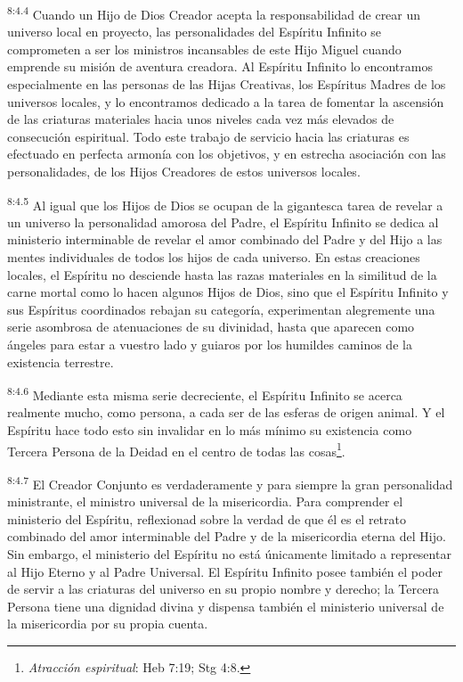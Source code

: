 \par
\textsuperscript{8:4.4} Cuando un Hijo de Dios Creador acepta la responsabilidad de crear un universo local en proyecto, las personalidades del Espíritu Infinito se comprometen a ser los ministros incansables de este Hijo Miguel cuando emprende su misión de aventura creadora. Al Espíritu Infinito lo encontramos especialmente en las personas de las Hijas Creativas, los Espíritus Madres de los universos locales, y lo encontramos dedicado a la tarea de fomentar la ascensión de las criaturas materiales hacia unos niveles cada vez más elevados de consecución espiritual. Todo este trabajo de servicio hacia las criaturas es efectuado en perfecta armonía con los objetivos, y en estrecha asociación con las personalidades, de los Hijos Creadores de estos universos locales.

\par
\textsuperscript{8:4.5} Al igual que los Hijos de Dios se ocupan de la gigantesca tarea de revelar a un universo la personalidad amorosa del Padre, el Espíritu Infinito se dedica al ministerio interminable de revelar el amor combinado del Padre y del Hijo a las mentes individuales de todos los hijos de cada universo. En estas creaciones locales, el Espíritu no desciende hasta las razas materiales en la similitud de la carne mortal como lo hacen algunos Hijos de Dios, sino que el Espíritu Infinito y sus Espíritus coordinados rebajan su categoría, experimentan alegremente una serie asombrosa de atenuaciones de su divinidad, hasta que aparecen como ángeles para estar a vuestro lado y guiaros por los humildes caminos de la existencia terrestre.

\par
\textsuperscript{8:4.6} Mediante esta misma serie decreciente, el Espíritu Infinito se acerca realmente mucho, como persona, a cada ser de las esferas de origen animal. Y el Espíritu hace todo esto sin invalidar en lo más mínimo su existencia como Tercera Persona de la Deidad en el centro de todas las cosas\footnote{\textit{Atracción espiritual}: Heb 7:19; Stg 4:8.}.

\par
\textsuperscript{8:4.7} El Creador Conjunto es verdaderamente y para siempre la gran personalidad ministrante, el ministro universal de la misericordia. Para comprender el ministerio del Espíritu, reflexionad sobre la verdad de que él es el retrato combinado del amor interminable del Padre y de la misericordia eterna del Hijo. Sin embargo, el ministerio del Espíritu no está únicamente limitado a representar al Hijo Eterno y al Padre Universal. El Espíritu Infinito posee también el poder de servir a las criaturas del universo en su propio nombre y derecho; la Tercera Persona tiene una dignidad divina y dispensa también el ministerio universal de la misericordia por su propia cuenta.

